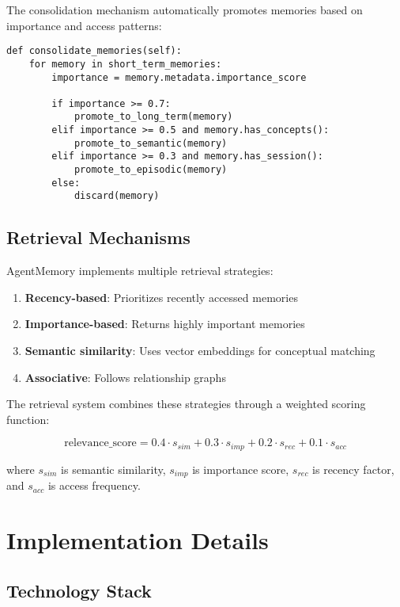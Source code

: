 \documentclass[journal]{IEEEtran}
\begin{document}
The consolidation mechanism automatically promotes memories based on importance and access patterns:

\begin{lstlisting}
def consolidate_memories(self):
    for memory in short_term_memories:
        importance = memory.metadata.importance_score
        
        if importance >= 0.7:
            promote_to_long_term(memory)
        elif importance >= 0.5 and memory.has_concepts():
            promote_to_semantic(memory)
        elif importance >= 0.3 and memory.has_session():
            promote_to_episodic(memory)
        else:
            discard(memory)
\end{lstlisting}

\subsection{Retrieval Mechanisms}

AgentMemory implements multiple retrieval strategies:
\begin{enumerate}
\item \textbf{Recency-based}: Prioritizes recently accessed memories
\item \textbf{Importance-based}: Returns highly important memories
\item \textbf{Semantic similarity}: Uses vector embeddings for conceptual matching
\item \textbf{Associative}: Follows relationship graphs
\end{enumerate}

The retrieval system combines these strategies through a weighted scoring function:

\begin{equation}
\text{relevance\_score} = 0.4 \cdot s_{sim} + 0.3 \cdot s_{imp} + 0.2 \cdot s_{rec} + 0.1 \cdot s_{acc}
\end{equation}

where $s_{sim}$ is semantic similarity, $s_{imp}$ is importance score, $s_{rec}$ is recency factor, and $s_{acc}$ is access frequency.

\section{Implementation Details}

\subsection{Technology Stack}
\end{document}
